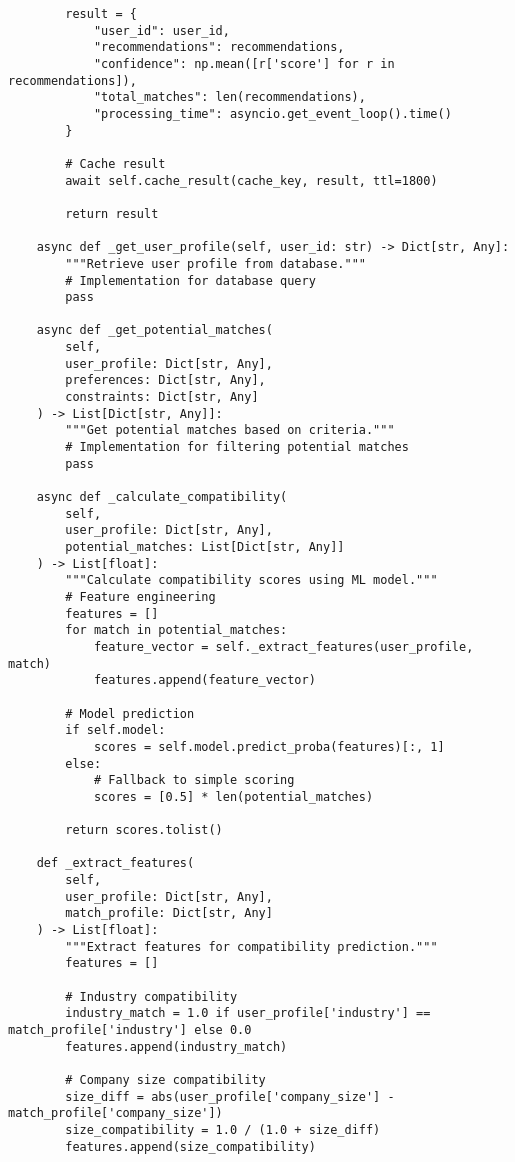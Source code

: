 \begin{verbatim}
        result = {
            "user_id": user_id,
            "recommendations": recommendations,
            "confidence": np.mean([r['score'] for r in recommendations]),
            "total_matches": len(recommendations),
            "processing_time": asyncio.get_event_loop().time()
        }
        
        # Cache result
        await self.cache_result(cache_key, result, ttl=1800)
        
        return result
    
    async def _get_user_profile(self, user_id: str) -> Dict[str, Any]:
        """Retrieve user profile from database."""
        # Implementation for database query
        pass
    
    async def _get_potential_matches(
        self, 
        user_profile: Dict[str, Any], 
        preferences: Dict[str, Any], 
        constraints: Dict[str, Any]
    ) -> List[Dict[str, Any]]:
        """Get potential matches based on criteria."""
        # Implementation for filtering potential matches
        pass
    
    async def _calculate_compatibility(
        self, 
        user_profile: Dict[str, Any], 
        potential_matches: List[Dict[str, Any]]
    ) -> List[float]:
        """Calculate compatibility scores using ML model."""
        # Feature engineering
        features = []
        for match in potential_matches:
            feature_vector = self._extract_features(user_profile, match)
            features.append(feature_vector)
        
        # Model prediction
        if self.model:
            scores = self.model.predict_proba(features)[:, 1]
        else:
            # Fallback to simple scoring
            scores = [0.5] * len(potential_matches)
        
        return scores.tolist()
    
    def _extract_features(
        self, 
        user_profile: Dict[str, Any], 
        match_profile: Dict[str, Any]
    ) -> List[float]:
        """Extract features for compatibility prediction."""
        features = []
        
        # Industry compatibility
        industry_match = 1.0 if user_profile['industry'] == match_profile['industry'] else 0.0
        features.append(industry_match)
        
        # Company size compatibility
        size_diff = abs(user_profile['company_size'] - match_profile['company_size'])
        size_compatibility = 1.0 / (1.0 + size_diff)
        features.append(size_compatibility)
        

\end{verbatim}

